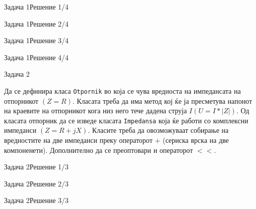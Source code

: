 \begin{frame}[fragile,shrink=10]{Задача 1}{Решение 1/4}

\end{frame}
\begin{frame}[fragile]{Задача 1}{Решение 2/4}

\end{frame}
\begin{frame}[fragile]{Задача 1}{Решение 3/4}

\end{frame}
\begin{frame}[fragile,shrink=10]{Задача 1}{Решение 4/4}

\end{frame}

\begin{frame}{Задача 2}
\begin{scriptsize}
Да се дефинира класа \texttt{Otpornik} во која се чува вредноста на импедансата на
отпорникот $(Z=R)$. Класата треба да има метод кој ќе ја пресметува напонот на
краевите на отпорникот кога низ него тече дадена струја $I (U=I*|Z|)$. Од
класата отпорник да се изведе класата  \texttt{Impedansa} која ќе работи со комплексни импеданси
$(Z=R+jX)$. Класите треба да овозможуваат собирање на вредностите на две
импеданси преку операторот $+$ (сериска врска на две компоненети). Дополнително
да се преоптовари и операторот $<<$.

\end{scriptsize}
\end{frame}

\begin{frame}[fragile]{Задача 2}{Решение 1/3}

\end{frame}
\begin{frame}[fragile]{Задача 2}{Решение 2/3}

\end{frame}
\begin{frame}[fragile,shrink=10]{Задача 2}{Решение 3/3}

\end{frame}



